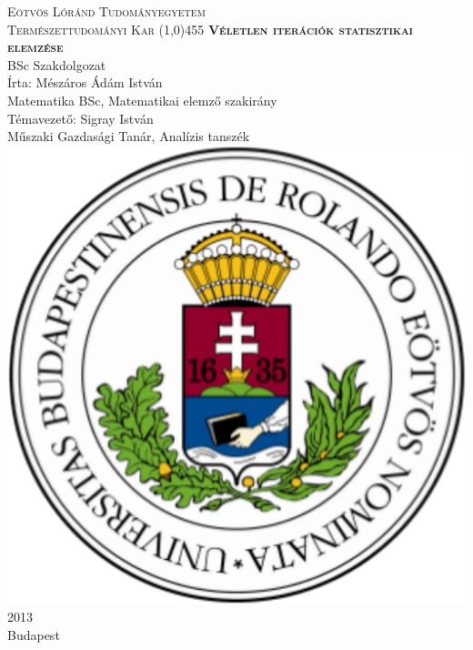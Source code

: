 \documentclass[a4paper,12pt]{report}
\newcommand{\noun}[1]{\textsc{#1}}
\newcommand{\blankpage}{
	\newpage
	\setcounter{page}{1}
	\thispagestyle{empty}
	\mbox{}
	\newpage
}
\begin{document}



	\thispagestyle{empty}
	\begin{center}
		{\large \noun{Eötvös Lóránd Tudományegyetem \\ Természettudományi Kar} }
		\line(1,0){455}
		\vspace{80pt}
		{\Huge \noun{\textbf{Véletlen iterációk statisztikai elemzése}}}
		\vspace{20pt}
		\\BSc Szakdolgozat
		\vspace{90pt}
		\\Írta: Mészáros Ádám István\\ Matematika BSc, Matematikai elemző szakirány\\
		\vspace{35pt}
		Témavezető: Sigray István\\ Műszaki Gazdasági Tanár, Analízis tanszék\\
		\vspace{80pt}
		\includegraphics[scale=0.21]{elte.png}
		\vspace{25pt}
		\\ 2013\\ Budapest
	\end{center}
	\blankpage
	\tableofcontents
\end{document}

